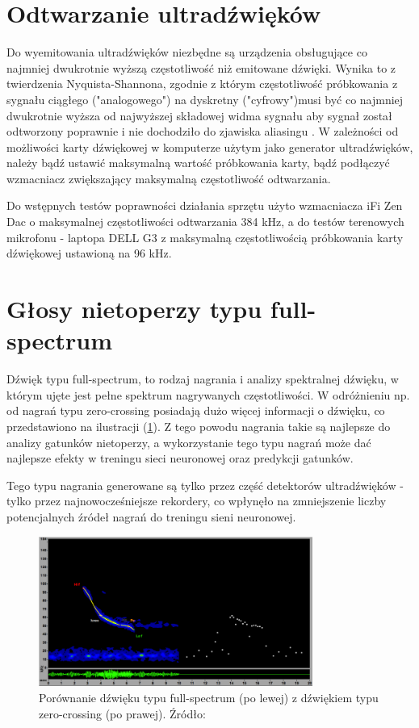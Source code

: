 \documentclass{sprz}
\begin{document}
\section{Odtwarzanie ultradźwięków}
Do wyemitowania ultradźwięków niezbędne są urządzenia obsługujące co najmniej dwukrotnie wyższą częstotliwość niż emitowane dźwięki. Wynika to z twierdzenia Nyquista-Shannona, zgodnie z którym częstotliwość próbkowania z sygnału ciągłego ("analogowego") na dyskretny ("cyfrowy")musi być co najmniej dwukrotnie wyższa od najwyższej składowej widma sygnału aby sygnał został odtworzony poprawnie i nie dochodziło do zjawiska aliasingu \cite{probkowanie}. W zależności od możliwości karty dźwiękowej w komputerze użytym jako generator ultradźwięków, należy bądź ustawić maksymalną wartość próbkowania karty, bądź podłączyć wzmacniacz zwiększający maksymalną częstotliwość odtwarzania.

Do wstępnych testów poprawności działania sprzętu użyto wzmacniacza iFi Zen Dac o maksymalnej częstotliwości odtwarzania 384 kHz, a do testów terenowych mikrofonu - laptopa DELL G3 z maksymalną częstotliwością próbkowania karty dźwiękowej ustawioną na 96 kHz.

\section{Głosy nietoperzy typu full-spectrum}
Dźwięk typu full-spectrum, to rodzaj nagrania i analizy spektralnej dźwięku, w którym ujęte jest pełne spektrum nagrywanych częstotliwości. W odróżnieniu np. od nagrań typu zero-crossing posiadają dużo więcej informacji o dźwięku, co przedstawiono na ilustracji (\ref{img:fullspectrum}). Z tego powodu nagrania takie są najlepsze do analizy gatunków nietoperzy, a wykorzystanie tego typu nagrań może dać najlepsze efekty w treningu sieci neuronowej oraz predykcji gatunków.

Tego typu nagrania generowane są tylko przez część detektorów ultradźwięków - tylko przez najnowocześniejsze rekordery, co wpłynęło na zmniejszenie liczby potencjalnych źródeł nagrań do treningu sieni neuronowej.

\begin{figure}[h]
  \centering
  \includegraphics[width=0.8\textwidth]{sprz/fullspectrum.png}
  \caption{Porównanie dźwięku typu full-spectrum (po lewej) z dźwiękiem typu zero-crossing (po prawej). Źródło: \cite{fullspectrum}}
  \label{img:fullspectrum}
\end{figure} 
\end{document}
